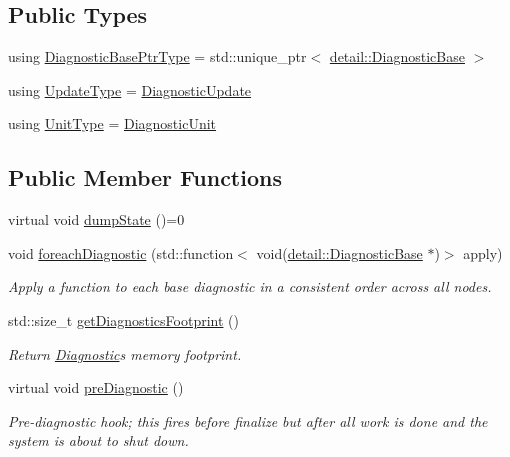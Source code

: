\subsection*{Public Types}
\begin{DoxyCompactItemize}
\item 
using \hyperlink{structvt_1_1runtime_1_1component_1_1_diagnostic_ad95ea698535524d0f82c5da9beaaaf37}{Diagnostic\+Base\+Ptr\+Type} = std\+::unique\+\_\+ptr$<$ \hyperlink{structvt_1_1runtime_1_1component_1_1detail_1_1_diagnostic_base}{detail\+::\+Diagnostic\+Base} $>$
\item 
using \hyperlink{structvt_1_1runtime_1_1component_1_1_diagnostic_a75e737294bb63e1898d9ac4515f0cf63}{Update\+Type} = \hyperlink{namespacevt_1_1runtime_1_1component_a896637e6e183a909a17bfd8d3943c206}{Diagnostic\+Update}
\item 
using \hyperlink{structvt_1_1runtime_1_1component_1_1_diagnostic_a2bcd1016fcdb6395844d4fd15d84a570}{Unit\+Type} = \hyperlink{namespacevt_1_1runtime_1_1component_a99ec18b08862c712176126bb7d0e307a}{Diagnostic\+Unit}
\end{DoxyCompactItemize}
\subsection*{Public Member Functions}
\begin{DoxyCompactItemize}
\item 
virtual void \hyperlink{structvt_1_1runtime_1_1component_1_1_diagnostic_a1b6da987a14917c7ee8a4d00138e62e6}{dump\+State} ()=0
\item 
void \hyperlink{structvt_1_1runtime_1_1component_1_1_diagnostic_a1d6951af40ad0b4020860c0b21b1a85c}{foreach\+Diagnostic} (std\+::function$<$ void(\hyperlink{structvt_1_1runtime_1_1component_1_1detail_1_1_diagnostic_base}{detail\+::\+Diagnostic\+Base} $\ast$)$>$ apply)
\begin{DoxyCompactList}\small\item\em Apply a function to each base diagnostic in a consistent order across all nodes. \end{DoxyCompactList}\item 
std\+::size\+\_\+t \hyperlink{structvt_1_1runtime_1_1component_1_1_diagnostic_a9c1f4174ac87bb6ae0ec186a08adbbbb}{get\+Diagnostics\+Footprint} ()
\begin{DoxyCompactList}\small\item\em Return \hyperlink{structvt_1_1runtime_1_1component_1_1_diagnostic}{Diagnostic}\textquotesingle{}s memory footprint. \end{DoxyCompactList}\item 
virtual void \hyperlink{structvt_1_1runtime_1_1component_1_1_diagnostic_a4e64b5a12ffc1874065aa8b09e6309a9}{pre\+Diagnostic} ()
\begin{DoxyCompactList}\small\item\em Pre-\/diagnostic hook; this fires before finalize but after all work is done and the system is about to shut down. \end{DoxyCompactList}\end{DoxyCompactItemize}
